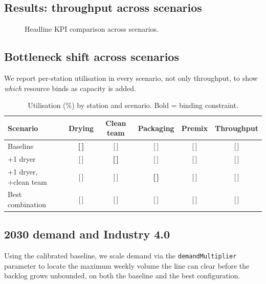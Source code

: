 \subsection{Results: throughput across scenarios}
\label{sec:expresults}
\begin{figure}[H]
\centering
{}
\caption{Headline KPI comparison across scenarios.}
\label{fig:expresults}
\end{figure}

\subsection{Bottleneck shift across scenarios}
\label{sec:btshift}
We report per-station utilisation in every scenario, not only throughput, to
show \emph{which} resource binds as capacity is added.

\begin{table}[H]
\centering
\caption{Utilisation (\%) by station and scenario. Bold = binding constraint.}
\label{tab:btshift}
\begin{tabularx}{\textwidth}{l c c c c c}
\toprule
Scenario & Drying & Clean team & Packaging & Premix & Throughput \\
\midrule
Baseline              & \textbf{[\,]} & [\,] & [\,] & [\,] & [\,] \\
+1 dryer              & [\,] & \textbf{[\,]} & [\,] & [\,] & [\,] \\
+1 dryer, +clean team & [\,] & [\,] & \textbf{[\,]} & [\,] & [\,] \\
Best combination      & [\,] & [\,] & [\,] & [\,] & [\,] \\
\bottomrule
\end{tabularx}
\end{table}

\subsection{2030 demand and Industry 4.0}
\label{sec:demand40}
Using the calibrated baseline, we scale demand via the \texttt{demandMultiplier}
parameter to locate the maximum weekly volume the line can clear before the
backlog grows unbounded, on both the baseline and the best configuration.

